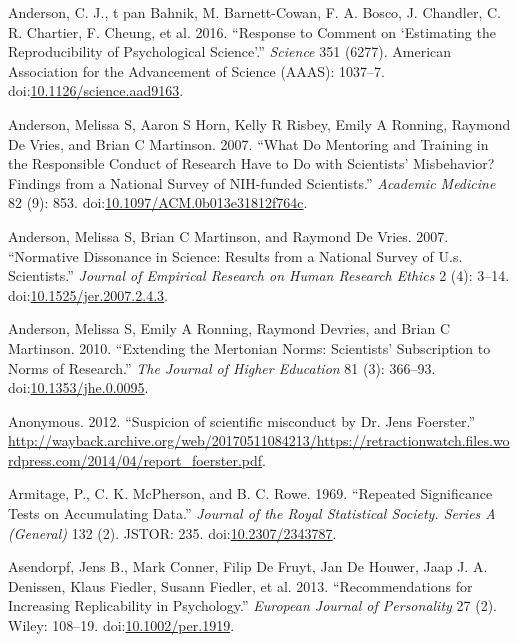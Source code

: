 \documentclass[a5paper]{book}
\begin{document}
\hypertarget{ref-doi:10.1126ux2fscience.aad9163}{}
Anderson, C. J., t pan Bahnik, M. Barnett-Cowan, F. A. Bosco, J.
Chandler, C. R. Chartier, F. Cheung, et al. 2016. ``Response to Comment
on `Estimating the Reproducibility of Psychological Science'.''
\emph{Science} 351 (6277). American Association for the Advancement of
Science (AAAS): 1037--7.
doi:\href{https://doi.org/10.1126/science.aad9163}{10.1126/science.aad9163}.

\hypertarget{ref-doi:10.1097ux2fACM.0b013e31812f764c}{}
Anderson, Melissa S, Aaron S Horn, Kelly R Risbey, Emily A Ronning,
Raymond De Vries, and Brian C Martinson. 2007. ``What Do Mentoring and
Training in the Responsible Conduct of Research Have to Do with
Scientists' Misbehavior? Findings from a National Survey of NIH-funded
Scientists.'' \emph{Academic Medicine} 82 (9): 853.
doi:\href{https://doi.org/10.1097/ACM.0b013e31812f764c}{10.1097/ACM.0b013e31812f764c}.

\hypertarget{ref-doi:10.1525ux2fjer.2007.2.4.3}{}
Anderson, Melissa S, Brian C Martinson, and Raymond De Vries. 2007.
``Normative Dissonance in Science: Results from a National Survey of
U.s. Scientists.'' \emph{Journal of Empirical Research on Human Research
Ethics} 2 (4): 3--14.
doi:\href{https://doi.org/10.1525/jer.2007.2.4.3}{10.1525/jer.2007.2.4.3}.

\hypertarget{ref-doi:10.1353ux2fjhe.0.0095}{}
Anderson, Melissa S, Emily A Ronning, Raymond Devries, and Brian C
Martinson. 2010. ``Extending the Mertonian Norms: Scientists'
Subscription to Norms of Research.'' \emph{The Journal of Higher
Education} 81 (3): 366--93.
doi:\href{https://doi.org/10.1353/jhe.0.0095}{10.1353/jhe.0.0095}.

\hypertarget{ref-foerster-complaint}{}
Anonymous. 2012. ``Suspicion of scientific misconduct by Dr. Jens
Foerster.''
\url{http://wayback.archive.org/web/20170511084213/https://retractionwatch.files.wordpress.com/2014/04/report_foerster.pdf}.

\hypertarget{ref-doi:10.2307ux2f2343787}{}
Armitage, P., C. K. McPherson, and B. C. Rowe. 1969. ``Repeated
Significance Tests on Accumulating Data.'' \emph{Journal of the Royal
Statistical Society. Series A (General)} 132 (2). JSTOR: 235.
doi:\href{https://doi.org/10.2307/2343787}{10.2307/2343787}.

\hypertarget{ref-doi:10.1002ux2fper.1919}{}
Asendorpf, Jens B., Mark Conner, Filip De Fruyt, Jan De Houwer, Jaap J.
A. Denissen, Klaus Fiedler, Susann Fiedler, et al. 2013.
``Recommendations for Increasing Replicability in Psychology.''
\emph{European Journal of Personality} 27 (2). Wiley: 108--19.
doi:\href{https://doi.org/10.1002/per.1919}{10.1002/per.1919}.
\end{document}
